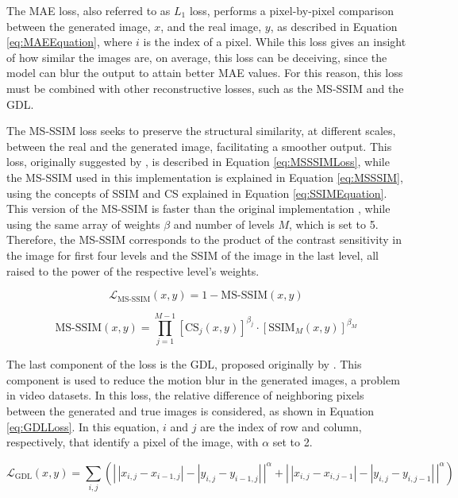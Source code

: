 The MAE loss, also referred to as $L_{1}$ loss, performs a pixel-by-pixel comparison between the generated image, $x$, and the real image, $y$, as described in Equation \ref{eq:MAEEquation}, where $i$ is the index of a pixel. While this loss gives an insight of how similar the images are, on average, this loss can be deceiving, since the model can blur the output to attain better MAE values. For this reason, this loss must be combined with other reconstructive losses, such as the MS-SSIM and the GDL.
\par
The MS-SSIM loss seeks to preserve the structural similarity, at different scales, between the real and the generated image, facilitating a smoother output. This loss, originally suggested by \textcite{Wang2003}, is described in Equation \ref{eq:MSSSIMLoss}, while the MS-SSIM used in this implementation is explained in Equation \ref{eq:MSSSIM}, using the concepts of SSIM and CS explained in Equation \ref{eq:SSIMEquation}. This version of the MS-SSIM is faster than the original implementation \parencite{Wang2003}, while using the same array of weights $\beta$ and number of levels $M$, which is set to 5. Therefore, the MS-SSIM corresponds to the product of the contrast sensitivity in the image for first four levels and the SSIM of the image in the last level, all raised to the power of the respective level's weights.

\begin{equation}
	\mathcal{L}_{\text{MS-SSIM}} (x, y) = 1 - \text{MS-SSIM}(x, y)
	\label{eq:MSSSIMLoss}
\end{equation}

\begin{equation}
	\text{MS-SSIM}(x, y) = \prod_{j=1}^{M-1} \left[ \text{CS}_j(x, y) \right]^{\beta_j} \cdot \left[ \text{SSIM}_M(x, y) \right]^{\beta_M}
	\label{eq:MSSSIM}
\end{equation}

The last component of the loss is the GDL, proposed originally by \textcite{Mathieu2016}. This component is used to reduce the motion blur in the generated images, a problem in video datasets. In this loss, the relative difference of neighboring pixels between the generated and true images is considered, as shown in Equation \ref{eq:GDLLoss}. In this equation, $i$ and $j$ are the index of row and column, respectively, that identify a pixel of the image, with $\alpha$ set to 2.

\begin{equation}
	\mathcal{L}_{\text{GDL}}(x, y) = \sum_{i,j} \left( \left|\,|x_{i,j} - x_{i-1,j}| - |y_{i,j} - y_{i-1,j}|\,\right|^{\alpha} + \left|\,|x_{i,j} - x_{i,j-1}| - |y_{i,j} - y_{i,j-1}|\,\right|^{\alpha} \right)
	\label{eq:GDLLoss}
\end{equation}

